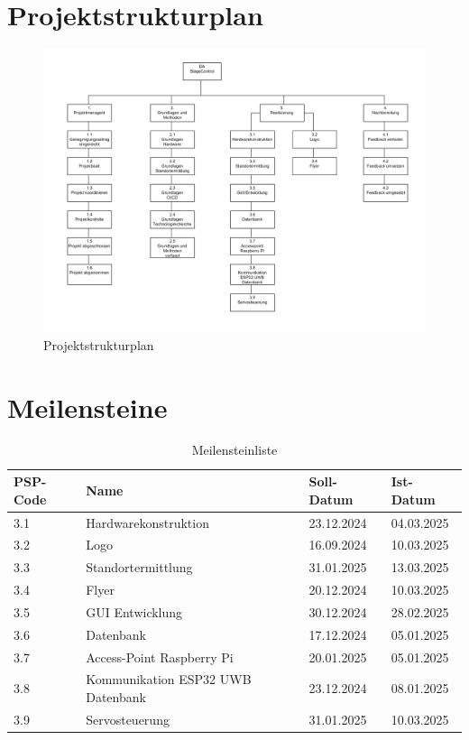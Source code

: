 \section*{Projektstrukturplan}
\begin{figure}[H]
	\centering
	\includegraphics[width=1.0\linewidth]{images/PSP.png}
	\caption[Projektstrukturplan]{Projektstrukturplan}
	\label{fig:projektstrukturplan}
\end{figure}
\newpage

\section*{Meilensteine}
\begin{table}[h]
	\centering
	\begin{tabular}{p{3cm} p{7cm} p{2cm} p{2cm}}
		\hline
		\textbf{PSP-Code} & \textbf{Name} & \textbf{Soll-Datum} & \textbf{Ist-Datum} \\
		\hline
		3.1 & Hardwarekonstruktion & 23.12.2024 & 04.03.2025 \\
		3.2 & Logo & 16.09.2024  & 10.03.2025 \\
		3.3 & Standortermittlung & 31.01.2025 & 13.03.2025 \\
		3.4 & Flyer & 20.12.2024 & 10.03.2025 \\
		3.5 & GUI Entwicklung & 30.12.2024 & 28.02.2025 \\
		3.6 & Datenbank & 17.12.2024 & 05.01.2025 \\
		3.7 & Access-Point Raspberry Pi & 20.01.2025 & 05.01.2025 \\
		3.8 & Kommunikation ESP32 UWB Datenbank & 23.12.2024  & 08.01.2025 \\
		3.9 & Servosteuerung & 31.01.2025 & 10.03.2025 \\
		\hline
	\end{tabular}
	\caption{Meilensteinliste}
	\label{tab:Meilensteinliste}
\end{table}
\newpage

